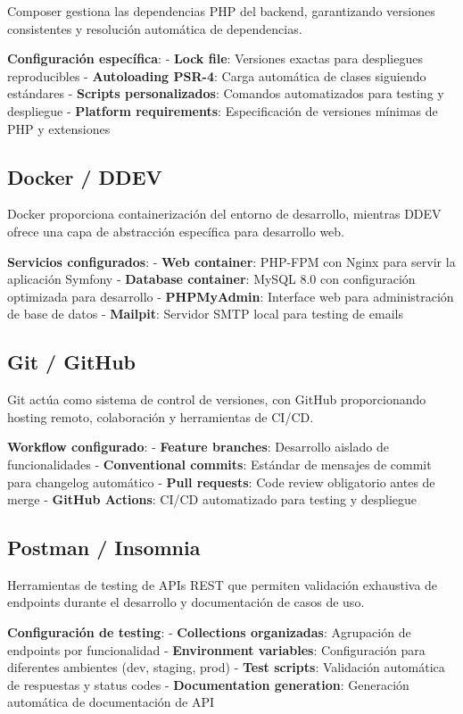 \documentclass[12pt,a4paper,oneside]{report}
\begin{document}
Composer gestiona las dependencias PHP del backend, garantizando
versiones consistentes y resolución automática de dependencias.

\textbf{Configuración específica}: - \textbf{Lock file}: Versiones
exactas para despliegues reproducibles - \textbf{Autoloading PSR-4}:
Carga automática de clases siguiendo estándares - \textbf{Scripts
personalizados}: Comandos automatizados para testing y despliegue -
\textbf{Platform requirements}: Especificación de versiones mínimas de
PHP y extensiones

\subsection{Docker / DDEV}\label{docker-ddev}

Docker proporciona containerización del entorno de desarrollo, mientras
DDEV ofrece una capa de abstracción específica para desarrollo web.

\textbf{Servicios configurados}: - \textbf{Web container}: PHP-FPM con
Nginx para servir la aplicación Symfony - \textbf{Database container}:
MySQL 8.0 con configuración optimizada para desarrollo -
\textbf{PHPMyAdmin}: Interface web para administración de base de datos
- \textbf{Mailpit}: Servidor SMTP local para testing de emails

\subsection{Git / GitHub}\label{git-github}

Git actúa como sistema de control de versiones, con GitHub
proporcionando hosting remoto, colaboración y herramientas de CI/CD.

\textbf{Workflow configurado}: - \textbf{Feature branches}: Desarrollo
aislado de funcionalidades - \textbf{Conventional commits}: Estándar de
mensajes de commit para changelog automático - \textbf{Pull requests}:
Code review obligatorio antes de merge - \textbf{GitHub Actions}: CI/CD
automatizado para testing y despliegue

\subsection{Postman / Insomnia}\label{postman-insomnia}

Herramientas de testing de APIs REST que permiten validación exhaustiva
de endpoints durante el desarrollo y documentación de casos de uso.

\textbf{Configuración de testing}: - \textbf{Collections organizadas}:
Agrupación de endpoints por funcionalidad - \textbf{Environment
variables}: Configuración para diferentes ambientes (dev, staging, prod)
- \textbf{Test scripts}: Validación automática de respuestas y status
codes - \textbf{Documentation generation}: Generación automática de
documentación de API
\end{document}
